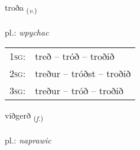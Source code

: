 \documentclass[frontgrid, backgrid]{flacards}\usepackage[]{graphicx}\usepackage[]{xcolor}
\begin{document}
\renewcommand{\flhead}{\vskip5pt \fboxsep=0pt {\small\bfseries\footnotesize Sagnorð | czasownik}}
\renewcommand{\fcfoot}{\vskip5pt \fboxsep=0pt \hspace{2pt}{\small\bfseries\footnotesize 3K}}

\renewcommand{\blhead}{\vskip5pt {\small\bfseries\footnotesize Sagnorð | czasownik }}
\renewcommand{\bcfoot}{\vskip5pt \hspace{2pt}{\small\bfseries\footnotesize 3K}}


{troða \small{\textsubscript{(\textit{v.})}} \\[1ex] %
\textphonetic{[tʰrɔːða]} \\
pl.: \emph{wpychac} \\  [2ex]
\renewcommand*{\arraystretch}{0.8}
\begin{tabular}{p{1cm}l}
\textsc{1sg}: & treð -- tróð -- troðið \\ 
\textsc{2sg}: & treður -- tróðst -- troðið \\ 
\textsc{3sg}: & treður -- tróð -- troðið \\ 
\end{tabular}
}

\renewcommand{\flhead}{\vskip5pt \fboxsep=0pt {\small\bfseries\footnotesize Nafnorð | rzeczownik}}
\renewcommand{\fcfoot}{\vskip5pt \fboxsep=0pt \hspace{2pt}{\small\bfseries\footnotesize 3K}}

\renewcommand{\blhead}{\vskip5pt {\small\bfseries\footnotesize Nafnorð | rzeczownik }}
\renewcommand{\bcfoot}{\vskip5pt \hspace{2pt}{\small\bfseries\footnotesize 3K}}


{viðgerð \small{\textsubscript{(\textit{f.})}} \\[1ex] %
\textphonetic{[vɪðcɛrð]} \\
pl.: \emph{naprawic} \\  [2ex]
\renewcommand*{\arraystretch}{0.8}
}
\end{document}
